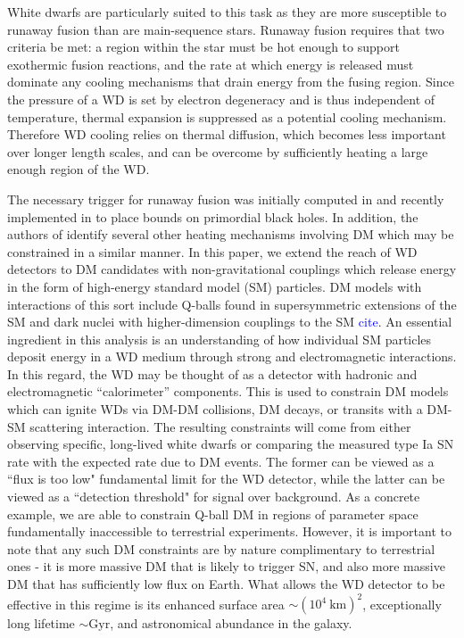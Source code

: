 \documentclass[twocolumn,showpacs,preprintnumbers,amsmath,amssymb,prd]{revtex4}
\begin{document}
White dwarfs are particularly suited to this task as they are more susceptible to runaway fusion than are main-sequence stars.
Runaway fusion requires that two criteria be met: a region within the star must be hot enough to support exothermic fusion reactions, and the rate at which energy is released must dominate any cooling mechanisms that drain energy from the fusing region.
Since the pressure of a WD is set by electron degeneracy and is thus independent of temperature, thermal expansion is suppressed as a potential cooling mechanism.
Therefore WD cooling relies on thermal diffusion, which becomes less important over longer length scales, and can be overcome by sufficiently heating a large enough region of the WD.

The necessary trigger for runaway fusion was initially computed in \cite{Woosley} and recently implemented in \cite{Graham:2015apa} to place bounds on primordial black holes. 
In addition, the authors of \cite{Graham:2015apa} identify several other heating mechanisms involving DM which may be constrained in a similar manner.
In this paper, we extend the reach of WD detectors to DM candidates with non-gravitational couplings which release energy in the form of high-energy standard model (SM) particles.
DM models with interactions of this sort include Q-balls found in supersymmetric extensions of the SM and dark nuclei with higher-dimension couplings to the SM \textcolor{blue}{cite}.
An essential ingredient in this analysis is an understanding of how individual SM particles deposit energy in a WD medium through strong and electromagnetic interactions. 
In this regard, the WD may be thought of as a detector with hadronic and electromagnetic ``calorimeter'' components.
This is used to constrain DM models which can ignite WDs via DM-DM collisions, DM decays, or transits with a DM-SM scattering interaction. 
The resulting constraints will come from either observing specific, long-lived white dwarfs or comparing the measured type Ia SN rate with the expected rate due to DM events.
The former can be viewed as a ``flux is too low" fundamental limit for the WD detector, while the latter can be viewed as a ``detection threshold" for signal over background.  
As a concrete example, we are able to constrain Q-ball DM in regions of parameter space fundamentally inaccessible to terrestrial experiments.
However, it is important to note that any such DM constraints are by nature complimentary to terrestrial ones - it is more massive DM that is likely to trigger SN, and also more massive DM that has sufficiently low flux on Earth.
What allows the WD detector to be effective in this regime is its enhanced surface area $\sim (10^4 ~\text{km})^2$, exceptionally long lifetime $\sim \text{Gyr}$, and astronomical abundance in the galaxy. 
\end{document}
